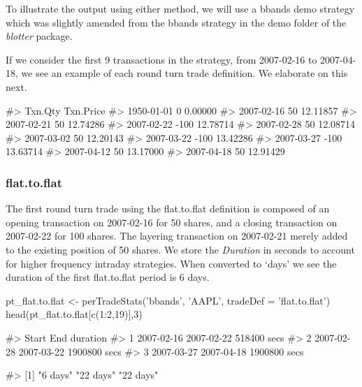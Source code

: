 To illustrate the output using either method, we will use a bbands demo
strategy which was slightly amended from the bbands strategy in the demo
folder of the \emph{blotter} package.

If we consider the first 9 transactions in the strategy, from 2007-02-16
to 2007-04-18, we see an example of each round turn trade definition. We
elaborate on this next.

\begin{Schunk}
\begin{Soutput}
#>            Txn.Qty Txn.Price
#> 1950-01-01       0   0.00000
#> 2007-02-16      50  12.11857
#> 2007-02-21      50  12.74286
#> 2007-02-22    -100  12.78714
#> 2007-02-28      50  12.08714
#> 2007-03-02      50  12.20143
#> 2007-03-22    -100  13.42286
#> 2007-03-27    -100  13.63714
#> 2007-04-12      50  13.17000
#> 2007-04-18      50  12.91429
\end{Soutput}
\end{Schunk}

\hypertarget{flat.to.flat}{%
\subsubsection{flat.to.flat}\label{flat.to.flat}}

The first round turn trade using the flat.to.flat definition is composed
of an opening transaction on 2007-02-16 for 50 shares, and a closing
transaction on 2007-02-22 for 100 shares. The layering transaction on
2007-02-21 merely added to the existing position of 50 shares. We store
the \emph{Duration} in seconds to account for higher frequency intraday
strategies. When converted to `days' we see the duration of the first
flat.to.flat period is 6 days.

\begin{Schunk}
\begin{Sinput}
pt_flat.to.flat <- perTradeStats('bbands', 'AAPL', tradeDef = 'flat.to.flat')
head(pt_flat.to.flat[c(1:2,19)],3)
\end{Sinput}
\begin{Soutput}
#>        Start        End     duration
#> 1 2007-02-16 2007-02-22  518400 secs
#> 2 2007-02-28 2007-03-22 1900800 secs
#> 3 2007-03-27 2007-04-18 1900800 secs
\end{Soutput}
\begin{Soutput}
#> [1] "6 days"  "22 days" "22 days"
\end{Soutput}
\end{Schunk}

